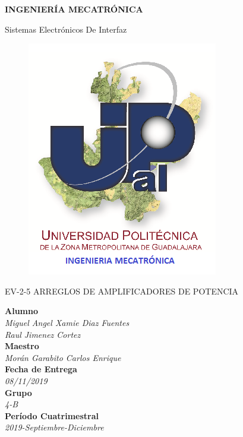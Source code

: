 \documentclass[10pt,a4paper]{article}
\author{Miguel Angel Xamie Diaz Fuentes/Jimenez Cortes Raul}
\begin{document}
\begin{center}
\begin{LARGE}
\textbf{INGENIERÍA MECATRÓNICA}\\
\end{LARGE}
{\large Sistemas Electrónicos De Interfaz}\\

\begin{figure}[hbtp]
\centering
\includegraphics[scale=0.80]{UPZMG_Mecatr_nica.png}
\end{figure} 

\begin{center}
\begin{LARGE}
EV-2-5 ARREGLOS DE AMPLIFICADORES DE POTENCIA
\end{LARGE}
\end{center}

\begin{Large}
\textbf{Alumno}
\\\textit{Miguel Angel Xamie Diaz Fuentes\\Raul Jimenez Cortez}
\textbf{\\Maestro}
\\\textit{Morán Garabito Carlos Enrique}
\textbf{\\Fecha de Entrega}
\\\textit{08/11/2019}
\textbf{\\Grupo}
\\\textit{4-B}\\
\textbf{Período Cuatrimestral}\\
\textit{2019-Septiembre-Diciembre}
\\
\end{Large}

\end{center}
\end{document}
